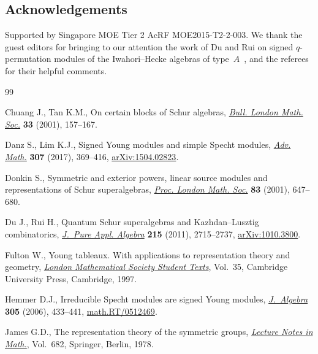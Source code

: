 \documentclass[pdftex]{sigma}
\begin{document}
\subsection*{Acknowledgements}

Supported by Singapore MOE Tier 2 AcRF MOE2015-T2-2-003. We thank the guest editors for bringing to our attention the work of Du and Rui on signed $q$-permutation modules of the Iwahori--Hecke algebras of type~$A$~\cite{DR}, and the referees for their helpful comments.

\begin{thebibliography}{99}
\footnotesize\itemsep=0pt

Chuang J., Tan K.M., On certain blocks of {S}chur algebras, \href{https://doi.org/10.1112/blms/33.2.157}{\textit{Bull.
 London Math. Soc.}} \textbf{33} (2001), 157--167.

Danz S., Lim K.J., Signed {Y}oung modules and simple {S}pecht modules,
 \href{https://doi.org/10.1016/j.aim.2016.11.016}{\textit{Adv. Math.}} \textbf{307} (2017), 369--416, \href{https://arxiv.org/abs/1504.02823}{arXiv:1504.02823}.

Donkin S., Symmetric and exterior powers, linear source modules and
 representations of {S}chur superalgebras, \href{https://doi.org/10.1112/plms/83.3.647}{\textit{Proc. London Math. Soc.}}
 \textbf{83} (2001), 647--680.

Du J., Rui H., Quantum {S}chur superalgebras and {K}azhdan--{L}usztig
 combinatorics, \href{https://doi.org/10.1016/j.jpaa.2011.03.015}{\textit{J.~Pure Appl. Algebra}} \textbf{215} (2011),
 2715--2737, \href{https://arxiv.org/abs/1010.3800}{arXiv:1010.3800}.

Fulton W., Young tableaux. With applications to representation theory and
 geometry, \href{https://doi.org/10.1017/CBO9780511626241}{\textit{London Mathematical Society Student Texts}}, Vol.~35,
 Cambridge University Press, Cambridge, 1997.

Hemmer D.J., Irreducible {S}pecht modules are signed {Y}oung modules,
 \href{https://doi.org/10.1016/j.jalgebra.2006.01.046}{\textit{J.~Algebra}} \textbf{305} (2006), 433--441, \href{https://arxiv.org/abs/math.RT/0512469}{math.RT/0512469}.

James G.D., The representation theory of the symmetric groups, \href{https://doi.org/10.1007/BFb0067708}{\textit{Lecture
 Notes in Math.}}, Vol.~682, Springer, Berlin, 1978.


\end{thebibliography}
\end{document}
